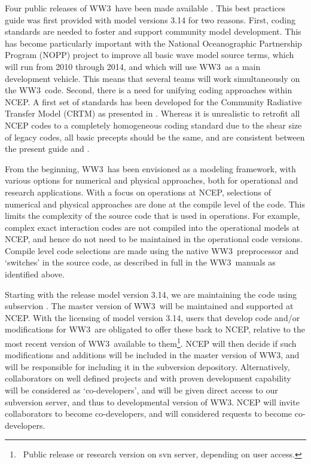 \documentclass[12pt]{article}
\newcommand{\ws}{WW3}
\begin{document}
Four public releases of \ws\ have been made available \citep{tol:OMB99a,
tol:OMB02c, tol:MMAB09a, tol:MMAB14a}. This best practices guide was first
provided with model versions 3.14 for two reasons. First, coding standards are
needed to foster and support community model development. This has become
particularly important with the National Oceanographic Partnership Program
(NOPP) project to improve all basic wave model source terms, which will run
from 2010 through 2014, and which will use \ws\ as a main development
vehicle. This means that several teams will work simultaneously on the \ws\
code. Second, there is a need for unifying coding approaches within NCEP. A
first set of standards has been developed for the Community Radiative Transfer
Model (CRTM) as presented in \cite{rep:PvD08}. Whereas it is unrealistic to
retrofit all NCEP codes to a completely homogeneous coding standard due to the
shear size of legacy codes, all basic precepts should be the same, and are
consistent between the present guide and \cite{rep:PvD08}.

From the beginning, \ws\ has been envisioned as a modeling framework, with
various options for numerical and physical approaches, both for operational
and research applications. With a focus on operations at NCEP, selections of
numerical and physical approaches are done at the compile level of the
code. This limits the complexity of the source code that is used in
operations. For example, complex exact interaction codes are not compiled into
the operational models at NCEP, and hence do not need to be maintained in the
operational code versions. Compile level code selections are made using the
native \ws\ preprocessor and `switches' in the source code, as described in
full in the \ws\ manuals as identified above.

Starting with the release model version 3.14, we are maintaining the code
using subservion \citep{bk:CSea06}. The master version of \ws\ will be
maintained and supported at NCEP. With the licensing of model version 3.14,
users that develop code and/or modifications for \ws\ are obligated to offer
these back to NCEP, relative to the most recent version of \ws\ available to
them\footnote{~Public release or research version on svn server, depending on
user access.}. NCEP will then decide if such modifications and additions will
be included in the master version of \ws, and will be responsible for
including it in the subversion depository. Alternatively, collaborators on
well defined projects and with proven development capability will be
considered as `co-developers', and will be given direct access to our
subversion server, and thus to developmental version of \ws. NCEP will invite
collaborators to become co-developers, and will considered requests to become
co-developers.
\end{document}
